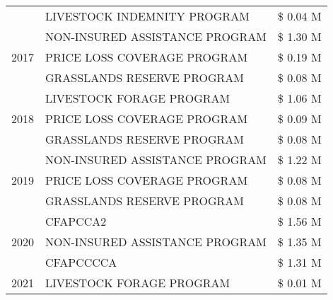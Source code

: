 \begin{tabular}{llr}
 & LIVESTOCK INDEMNITY PROGRAM & \$ 0.04 M \\
\cline{1-3}
\multirow[t]{3}{*}{2017} & NON-INSURED ASSISTANCE PROGRAM & \$ 1.30 M \\
 & PRICE LOSS COVERAGE PROGRAM & \$ 0.19 M \\
 & GRASSLANDS RESERVE PROGRAM & \$ 0.08 M \\
\cline{1-3}
\multirow[t]{3}{*}{2018} & LIVESTOCK FORAGE PROGRAM & \$ 1.06 M \\
 & PRICE LOSS COVERAGE PROGRAM & \$ 0.09 M \\
 & GRASSLANDS RESERVE PROGRAM & \$ 0.08 M \\
\cline{1-3}
\multirow[t]{3}{*}{2019} & NON-INSURED ASSISTANCE PROGRAM & \$ 1.22 M \\
 & PRICE LOSS COVERAGE PROGRAM & \$ 0.08 M \\
 & GRASSLANDS RESERVE PROGRAM & \$ 0.08 M \\
\cline{1-3}
\multirow[t]{3}{*}{2020} & CFAPCCA2 & \$ 1.56 M \\
 & NON-INSURED ASSISTANCE PROGRAM & \$ 1.35 M \\
 & CFAPCCCCA & \$ 1.31 M \\
\cline{1-3}
2021 & LIVESTOCK FORAGE PROGRAM & \$ 0.01 M \\
\cline{1-3}
\bottomrule
\end{tabular}
